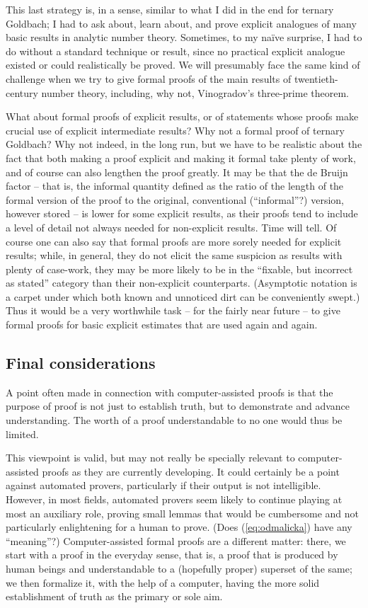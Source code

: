 This last strategy is, in a sense, similar to what I did in the end for
ternary Goldbach; I had to ask about, learn about, and prove explicit
analogues of many basic results in analytic number theory. Sometimes, to my
na\"ive surprise, I had to do without a standard technique or result, since
no practical explicit analogue existed or could realistically be proved.
We will presumably face the same kind of challenge when we try to give 
formal proofs of the main results of twentieth-century number theory,
including, why not, Vinogradov's three-prime theorem.

What about formal proofs of explicit results, or of statements whose proofs
make crucial use of explicit intermediate results? Why not a formal proof of
ternary Goldbach? Why not indeed, in the long run, but we have to be realistic
about the fact that both making a proof explicit and making it formal take
plenty of work, and of course can also lengthen the proof greatly. It may be
that the de Bruijn factor -- that is, the informal quantity defined as the
ratio of the length of the formal version of the proof to the original, conventional (``informal''?) version, however stored -- is lower for some explicit results, as their proofs tend to
include a level of detail not always needed for non-explicit results. Time will
tell. Of course one can also say that formal proofs are more sorely needed
for explicit results; while, in general,
they do not elicit the same suspicion as results with plenty of case-work,
they may be more likely to be in the ``fixable, but incorrect as stated''
category than their non-explicit counterparts. (Asymptotic notation is
a carpet under which both known and unnoticed dirt can be conveniently swept.)
Thus it would be a very worthwhile task -- for the fairly near future --
to give formal proofs for basic explicit
estimates that are used again and again.

\subsection{Final considerations}

A point often made in connection with computer-assisted proofs is that the
purpose of proof is not just to establish truth, but to demonstrate and
advance understanding. The worth of a proof understandable to no one
would thus be limited.

This viewpoint is valid, but may not really be specially relevant to
computer-assisted proofs as they are currently developing. It could certainly
be a point against automated provers, particularly if their output is not
intelligible. However, in most fields,
automated provers seem likely to continue playing at most an auxiliary role, 
proving small lemmas that would be cumbersome and not particularly
enlightening for a human to prove. (Does (\ref{eq:odmalicka}) have any
``meaning''?)
Computer-assisted formal proofs are a
different matter: there, we start with a proof in the everyday sense, that is,
a proof that is produced by human beings and understandable to a (hopefully
proper) superset of the same; we then formalize it, with the help of a computer,
having the more solid establishment of truth as the primary or sole aim.

